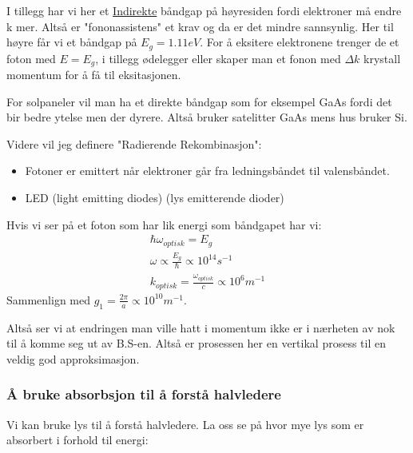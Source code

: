 \documentclass{article}
\begin{document}
I tillegg har vi her et \underline{Indirekte} båndgap på høyresiden fordi elektroner må endre k mer. Altså er "fononassistens" et krav og da er det mindre sannsynlig. Her til høyre får vi et båndgap på $E_g = 1.11 eV$. For å eksitere elektronene trenger de et foton med $E = E_g$, i tillegg ødelegger eller skaper man et fonon med $\Delta k$ krystall momentum for å få til eksitasjonen.


For solpaneler vil man ha et direkte båndgap som for eksempel GaAs fordi det bir bedre ytelse men der dyrere. Altså bruker satelitter GaAs mens hus bruker Si.

Videre vil jeg definere "Radierende Rekombinasjon":
\begin{itemize}
  \item Fotoner er emittert når elektroner går fra ledningsbåndet til valensbåndet.
  \item LED (light emitting diodes) (lys emitterende dioder)
\end{itemize}

Hvis vi ser på et foton som har lik energi som båndgapet har vi:
\begin{align*}
  \hbar \omega_{optisk} = E_g \\
  \omega \propto \frac{E_g}{\hbar} \propto 10^{14} s^{-1} \\
  k_{optisk} = \frac{\omega_{optisk}}{c} \propto 10^6 m^{-1}
\end{align*}
Sammenlign med $g_1 = \frac{2 \pi}{a} \propto 10^{10} m^{-1}$.

Altså ser vi at endringen man ville hatt i momentum ikke er i nærheten av nok til å komme seg ut av B.S-en. Altså er prosessen her en vertikal prosess til en veldig god approksimasjon. 

\subsubsection{Å bruke absorbsjon til å forstå halvledere}
Vi kan bruke lys til å forstå halvledere. La oss se på hvor mye lys som er absorbert i forhold til energi:
\end{document}
